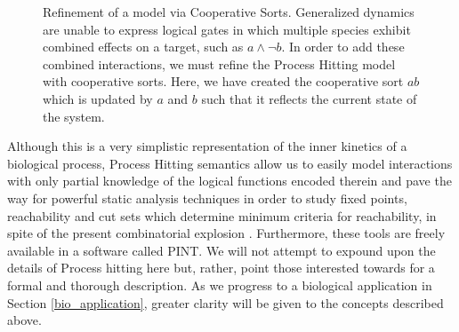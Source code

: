 \documentclass{article}
\begin{document}
\begin{figure}[h]
\centering
{}
\caption{Refinement of a model via Cooperative Sorts. Generalized dynamics are unable to express logical gates in which multiple species exhibit combined effects on a target, such as $a\wedge \neg b$. In order to add these combined interactions, we must refine the Process Hitting model with cooperative sorts. Here, we have created the cooperative sort $ab$ which is updated by $a$ and $b$ such that it reflects the current state of the system.}
\label{PH_coop}
\end{figure}

Although this is a very simplistic representation of the inner kinetics of a biological process, Process Hitting semantics allow us to easily model interactions with only partial knowledge of the logical functions encoded therein and pave the way for powerful static analysis techniques in order to study fixed points, reachability and cut sets which determine minimum criteria for reachability, in spite of the present combinatorial explosion \cite{FPMR13-CS2Bio, PMR10-TCSB}. Furthermore, these tools are freely available in a software called PINT. We will not attempt to expound upon the details of Process hitting here but, rather, point those interested towards \cite{PMR10-TCSB} for a formal and thorough description. As we progress to a biological application in Section \ref{bio_application}, greater clarity will be given to the concepts described above.
\end{document}
